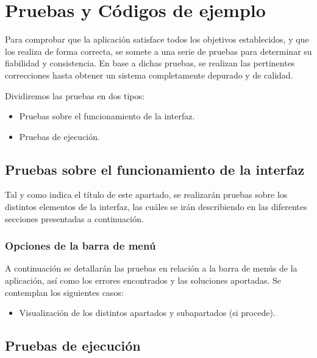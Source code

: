 \documentclass[a4paper, 12pt]{book}
\begin{document}
\chapter{Pruebas y Códigos de ejemplo}
Para comprobar que la aplicación satisface todos los objetivos establecidos, y que los realiza de forma correcta, se somete a una serie de 
pruebas para determinar su fiabilidad y consistencia. En base a dichas pruebas, se realizan las pertinentes correcciones hasta obtener un sistema
completamente depurado y de calidad.

Dividiremos las pruebas en dos tipos:

\begin{itemize}
 \item Pruebas sobre el funcionamiento de la interfaz.
 \item Pruebas de ejecución.
\end{itemize}


\section{Pruebas sobre el funcionamiento de la interfaz}
Tal y como indica el título de este apartado, se realizarán pruebas sobre los distintos elementos de la interfaz, las cuáles se irán describiendo
en las diferentes secciones presentadas a continuación.

\subsection{Opciones de la barra de menú}
A continuación se detallarán las pruebas en relación a la barra de menús de la aplicación, así como los errores encontrados y las soluciones 
aportadas. Se contemplan los siguientes casos:

\begin{itemize}
  \item Visualización de los distintos apartados y subapartados (si procede).
  
\end{itemize}



\section{Pruebas de ejecución}
\end{document}
